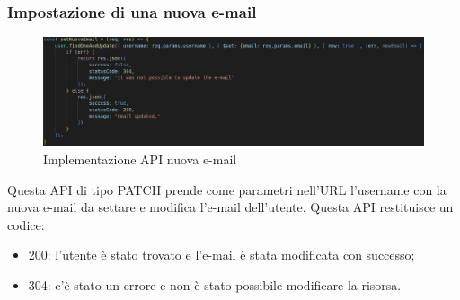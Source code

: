 \subsubsection{Impostazione di una nuova e-mail}
\begin{figure}[!h]
\centering
\includegraphics[scale=0.4]{images/api_nuova_email.jpg}
\caption{Implementazione API nuova e-mail}
\label{fig:api_nuova_email}
\end{figure}
\noindent
Questa API di tipo PATCH prende come parametri nell'URL l'username con la nuova e-mail da settare e modifica l'e-mail dell'utente.
Questa API restituisce un codice:
\begin{itemize}
    \item 200: l'utente è stato trovato e l'e-mail è stata modificata con successo;
    \item 304: c'è stato un errore e non è stato possibile modificare la risorsa.
\end{itemize}

\newpage
